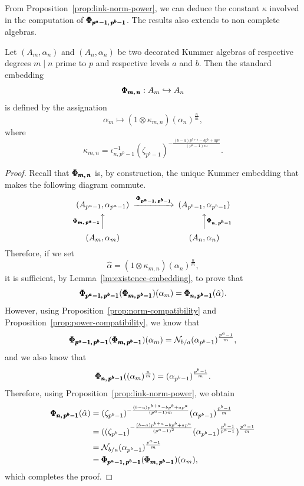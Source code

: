 From Proposition~\ref{prop:link-norm-power}, we can deduce the constant $\kappa$
involved in the computation of $\pmb{\Phi_{{p^a-1},\,{p^b-1}}}$. The results also extends
to non complete algebras.
\begin{cor}
  \label{cor:link-norm-power}
  Let $(A_m, \alpha_n)$ and $(A_n, \alpha_n)$ be two decorated Kummer algebras
  of respective degrees $m\mid n$ prime to $p$ and respective levels $a$ and
  $b$. Then the standard embedding
  \[
    \pmb{\Phi_{{m},\,{n}}}:A_m\hookrightarrow A_n
  \]
  is defined by the assignation
  \[
    \alpha_m\mapsto (1\otimes\kappa_{m, n})(\alpha_n)^{\frac{n}{m}},
  \]
  where 
  \[
    \kappa_{m, n} = \iota_{n,
    p^b-1}^{-1}(\zeta_{p^b-1})^{-\frac{(b-a)p^{b+a}-bp^b+ap^a}{(p^a-1)m}}.
  \]
\end{cor}
\begin{proof}
  Recall that $\pmb{\Phi_{{m},\,{n}}}$ is, by construction, the unique Kummer embedding
  that makes the following diagram commute.
\begin{equation*}
\begin{CD}
(A_{p^a-1},\alpha_{p^a-1}) @>{\stdemb{p^a-1}{p^b-1}}>> (A_{p^b-1},\alpha_{p^b-1}) \\
@A{\stdemb{m}{p^a-1}}AA @AA{\stdemb{n}{p^b-1}}A\\
(A_m,\alpha_m) @. (A_n,\alpha_n)
\end{CD}
\end{equation*}
Therefore, if we set
\[
  \hat\alpha = (1\otimes\kappa_{m, n})(\alpha_n)^{\frac{n}{m}},
\]
it is sufficient, by Lemma~\ref{lm:existence-embedding}, to prove that 
\[
  \pmb{\Phi_{{p^a-1},\,{p^b-1}}}(\pmb{\Phi_{{m},\,{p^b-1}}})(\alpha_m) =
  \pmb{\Phi_{{n},\,{p^b-1}}}(\hat\alpha).
\]
However, using Proposition~\ref{prop:norm-compatibility} and
Proposition~\ref{prop:power-compatibility}, we know that
\[
  \pmb{\Phi_{{p^a-1},\,{p^b-1}}}(\pmb{\Phi_{{m},\,{p^b-1}}})(\alpha_m) =
  \mathcal{N}_{b/a}(\alpha_{p^b-1})^{\frac{p^a-1}{m}},
\]
and we also know that
\[
  \pmb{\Phi_{{n},\,{p^b-1}}}( (\alpha_m)^{\frac{n}{m}}) =
  (\alpha_{p^b-1})^{\frac{p^b-1}{m}}.
\]
Therefore, using Proposition~\ref{prop:link-norm-power}, we obtain
\begin{align*}
  \pmb{\Phi_{{n},\,{p^b-1}}}(\hat\alpha) &=   (\zeta_{p^b-1})^{-\frac{(b-a)p^{b+a}
-bp^b+ap^a}{(p^a-1)m}}(\alpha_{p^b-1})^{\frac{p^b-1}{m}}\\
&=( (\zeta_{p^b-1})^{-\frac{(b-a)p^{b+a}
-bp^b+ap^a}{(p^a-1)^2}}(\alpha_{p^b-1})^{\frac{p^b-1}{p^a-1}})^{\frac{p^a-1}{m}}\\
&= \mathcal{N}_{b/a}(\alpha_{p^b-1})^{\frac{p^a-1}{m}}\\
&= \pmb{\Phi_{{p^a-1},\,{p^b-1}}}(\pmb{\Phi_{{m},\,{p^b-1}}})(\alpha_m),
\end{align*}
which completes the proof.
\end{proof}
